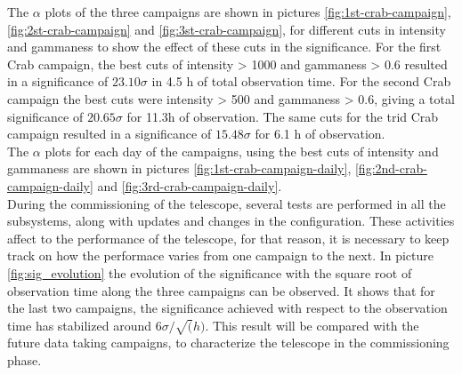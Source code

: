 \documentclass[main.tex]{subfiles}
\begin{document}
The $\alpha$ plots of the three campaigns are shown in pictures \ref{fig:1st-crab-campaign}, \ref{fig:2st-crab-campaign} and \ref{fig:3st-crab-campaign}, for different cuts in intensity and gammaness to show the effect of these cuts in the significance. For the first Crab campaign, the best cuts of intensity > 1000 and gammaness > 0.6 resulted in a significance of $23.10 \sigma$ in 4.5 h of total observation time. For the second Crab campaign the best cuts were intensity > 500 and gammaness > 0.6, giving a total significance of $20.65\sigma$ for 11.3h of observation. The same cuts for the trid Crab campaign resulted in a significance of $15.48\sigma$ for 6.1 h of observation.\\
The $\alpha$ plots for each day of the campaigns, using the best cuts of intensity and gammaness are shown in pictures \ref{fig:1st-crab-campaign-daily}, \ref{fig:2nd-crab-campaign-daily} and \ref{fig:3rd-crab-campaign-daily}.\\
During the commissioning of the telescope, several tests are performed in all the subsystems, along with updates and changes in the configuration. These activities affect to the performance of the telescope, for that reason, it is necessary to keep track on how the performace varies from one campaign to the next. In picture \ref{fig:sig_evolution} the evolution of the significance with the square root of observation time along the three campaigns can be observed. It shows that for the last two campaigns, the significance achieved with respect to the observation time has stabilized around $6\sigma / \sqrt(h)$. This result will be compared with the future data taking campaigns, to characterize the telescope in the commissioning phase. 
\end{document}
